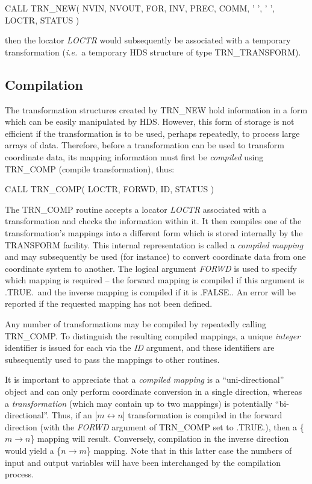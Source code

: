 \documentclass[twoside,nolof,11pt]{starlink}
\providecommand{\name}[1]{\small{#1}}
\providecommand{\fortvar}[1]{\emph{#1}}
\begin{document}
\begin{terminalv}
CALL TRN_NEW( NVIN, NVOUT, FOR, INV, PREC, COMM, ' ', ' ', LOCTR, STATUS )
\end{terminalv}

then the locator \fortvar{LOCTR} would subsequently be associated with a
temporary transformation (\emph{i.e.}\ a temporary \name{HDS} structure of
type \name{TRN\_TRANSFORM}).


\subsection{Compilation}

The transformation structures created by \name{TRN\_NEW} hold information in
a form which can be easily manipulated by \name{HDS}.
However, this form of storage is not efficient if the transformation is to
be used, perhaps repeatedly, to process large arrays of data.
Therefore, before a transformation can be used to transform coordinate data,
its mapping information must first be \emph{compiled} using \name{TRN\_COMP}
(compile transformation), thus:

\begin{terminalv}
      CALL TRN_COMP( LOCTR, FORWD, ID, STATUS )
\end{terminalv}

The \name{TRN\_COMP} routine accepts a locator \fortvar{LOCTR} associated
with a transformation and checks the information within it.
It then compiles one of the transformation's mappings into a different form
which is stored internally by the \name{TRANSFORM} facility.
This internal representation is called a \emph{compiled mapping} and may
subsequently be used (for instance) to convert coordinate data from one
coordinate system to another.
The logical argument \fortvar{FORWD} is used to specify which mapping is
required -- the forward mapping is compiled if this argument is
\name{.TRUE.}\ and the inverse mapping is compiled if it is \name{.FALSE.}.
An error will be reported if the requested mapping has not been defined.

Any number of transformations may be compiled by repeatedly calling
\name{TRN\_COMP}.
To distinguish the resulting compiled mappings, a unique \emph{integer}
identifier is issued for each via the \fortvar{ID} argument, and these
identifiers are subsequently used to pass the mappings to other routines.

It is important to appreciate that a \emph{compiled mapping} is a
``uni-directional'' object and can only perform coordinate conversion in a
single direction, whereas a \emph{transformation} (which may contain up to
two mappings) is potentially ``bi-directional''.
Thus, if an [$m \leftrightarrow n$] transformation is compiled in the
forward direction (with the \fortvar{FORWD} argument of \name{TRN\_COMP} set
to \name{.TRUE.}), then a \mbox{\{$m \rightarrow n$\}} mapping will result.
Conversely, compilation in the inverse direction would yield a \mbox{\{$n
\rightarrow m$\}} mapping.
Note that in this latter case the numbers of input and output variables will
have been interchanged by the compilation process.
\end{document}
